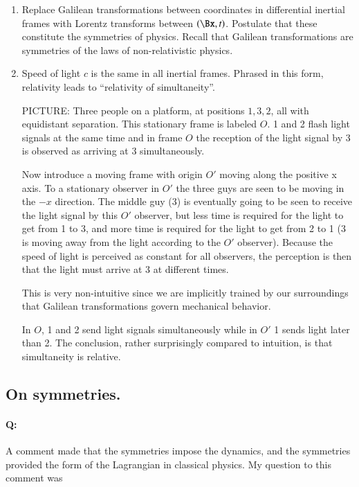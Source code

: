 \begin{enumerate}

\item Replace Galilean transformations between coordinates in differential inertial frames with Lorentz transforms between $(\Bx, t)$.  Postulate that these constitute the symmetries of physics.  Recall that Galilean transformations are symmetries of the laws of non-relativistic physics.  

\item Speed of light $c$ is the same in all inertial frames.  Phrased in this form, relativity leads to ``relativity of simultaneity''.

PICTURE: Three people on a platform, at positions $1,3,2$, all with equidistant separation.  This stationary frame is labeled $O$.  1 and 2 flash light signals at the same time and in frame $O$ the reception of the light signal by 3 is observed as arriving at 3 simultaneously.

Now introduce a moving frame with origin $O'$ moving along the positive x axis.  To a stationary observer in $O'$ the three guys are seen to be moving in the $-x$ direction.  The middle guy (3) is eventually going to be seen to receive the light signal by this $O'$ observer, but less time is required for the light to get from 1 to 3, and more time is required for the light to get from 2 to 1 (3 is moving away from the light according to the $O'$ observer).  Because the speed of light is perceived as constant for all observers, the perception is then that the light must arrive at 3 at different times.

This is very non-intuitive since we are implicitly trained by our surroundings that Galilean transformations govern mechanical behavior.

In $O$, 1 and 2 send light signals simultaneously while in $O'$ 1 sends light later than 2.  The conclusion, rather surprisingly compared to intuition, is that simultaneity is relative.

\end{enumerate}

\subsection{On symmetries.}

\paragraph{Q:}
A comment made that the symmetries impose the dynamics, and the symmetries provided the form of the Lagrangian in classical physics.  My question to this comment was

